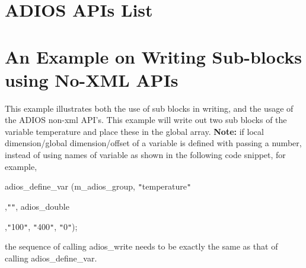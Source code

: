 \section{ADIOS APIs List}



\section{An Example on Writing Sub-blocks using No-XML APIs}
\label{section-appendix-writing-subblocks}

This example illustrates both the use of sub blocks in writing, and the usage of 
the ADIOS non-xml API's. This example will write out two sub blocks of the variable 
temperature and place these in the global array. \textbf{Note:} if local dimension/global 
dimension/offset of a variable is defined with passing a number, instead of using 
names of variable as shown in the following code snippet, for example,

adios\_define\_var (m\_adios\_group, \texttt{"}temperature\texttt{"}

\parindent=86pt
,\texttt{"}\texttt{"}, adios\_double

,\texttt{"}100\texttt{"}, \texttt{"}400\texttt{"}, \texttt{"}0\texttt{"});

\parindent=0pt
the sequence of calling adios\_write needs to be exactly the same as that of calling 
adios\_define\_var.

